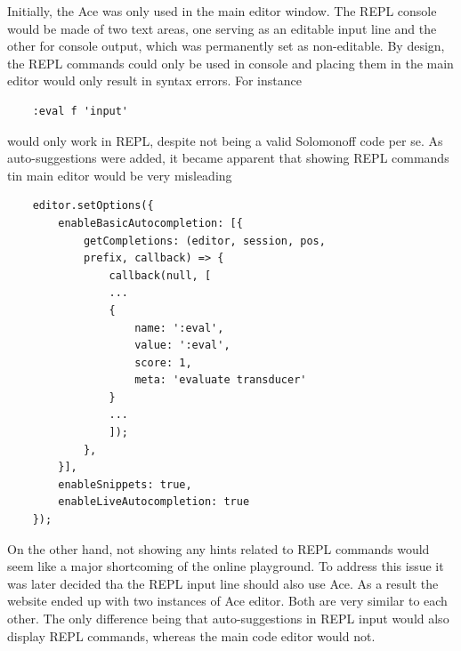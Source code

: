 Initially, the Ace  was only used in the main editor window. The REPL console would be made of two text areas, one serving as an editable input line and the other for console output, which was permanently set as non-editable. By design, the REPL commands could only be used in console and placing them in the main editor would only result in syntax errors. For instance
\begin{lstlisting}
	:eval f 'input'
\end{lstlisting}
would only work in REPL, despite not being a valid Solomonoff code per se. As auto-suggestions were added, it became apparent that showing  REPL commands tin main editor would be very misleading
\begin{lstlisting}
	editor.setOptions({
		enableBasicAutocompletion: [{
			getCompletions: (editor, session, pos,
			prefix, callback) => {
				callback(null, [
				... 
				{
					name: ':eval',
					value: ':eval',
					score: 1,
					meta: 'evaluate transducer'
				}
				...
				]);
			},
		}],
		enableSnippets: true,
		enableLiveAutocompletion: true
	});
\end{lstlisting}
On the other hand, not showing any hints related to REPL commands would seem like a major shortcoming of the online playground. To address this issue it was later decided tha the REPL input line should also use Ace. As a result the website ended up with two instances of Ace editor. Both are very similar to each other. The only difference being that auto-suggestions in REPL input would also display REPL commands, whereas the main code editor would not.


